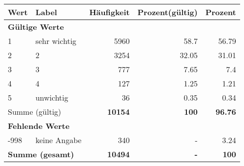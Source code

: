      \begin{longtable}{lXrrr}
     \toprule
     \textbf{Wert} & \textbf{Label} & \textbf{Häufigkeit} & \textbf{Prozent(gültig)} & \textbf{Prozent} \\
     \endhead
     \midrule
     \multicolumn{5}{l}{\textbf{Gültige Werte}}\\

     1 &
     \multicolumn{1}{X}{ sehr wichtig   } &


       \num{5960} &
       \num[round-mode=places,round-precision=2]{58,7} &
         \num[round-mode=places,round-precision=2]{56,79} \\

     2 &
     \multicolumn{1}{X}{ 2   } &


       \num{3254} &
       \num[round-mode=places,round-precision=2]{32,05} &
         \num[round-mode=places,round-precision=2]{31,01} \\

     3 &
     \multicolumn{1}{X}{ 3   } &


       \num{777} &
       \num[round-mode=places,round-precision=2]{7,65} &
         \num[round-mode=places,round-precision=2]{7,4} \\

     4 &
     \multicolumn{1}{X}{ 4   } &


       \num{127} &
       \num[round-mode=places,round-precision=2]{1,25} &
         \num[round-mode=places,round-precision=2]{1,21} \\

     5 &
     \multicolumn{1}{X}{ unwichtig   } &


       \num{36} &
       \num[round-mode=places,round-precision=2]{0,35} &
         \num[round-mode=places,round-precision=2]{0,34} \\
     \midrule
     \multicolumn{2}{l}{Summe (gültig)} &
       \textbf{\num{10154}} &
     \textbf{100} &
       \textbf{\num[round-mode=places,round-precision=2]{96,76}} \\
     \multicolumn{5}{l}{\textbf{Fehlende Werte}}\\
       -998 &
       keine Angabe &
         \num{340} &
        - &
         \num[round-mode=places,round-precision=2]{3,24} \\
     \midrule
     \multicolumn{2}{l}{\textbf{Summe (gesamt)}} &
          \textbf{\num{10494}} &
        \textbf{-} &
        \textbf{100} \\
     \bottomrule
     \end{longtable}
     
